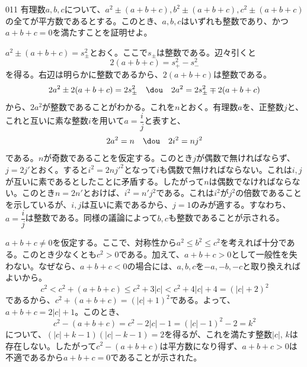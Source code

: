 \begin{prob}{011}{}{}
 有理数$a,b,c$について、$a^2\pm (a+b+c), b^2\pm (a+b+c), c^2\pm (a+b+c)$の全てが平方数であるとする。このとき、$a,b,c$はいずれも整数であり、かつ$a+b+c=0$を満たすことを証明せよ。
\end{prob}

$a^2\pm (a+b+c)=s_\pm^2$とおく。ここで$s_\pm$は整数である。辺々引くと
\[ 2(a+b+c)=s_+^2-s_-^2 \]
を得る。右辺は明らかに整数であるから、$2(a+b+c)$は整数である。
\[ 2a^2\pm 2(a+b+c)=2s_\pm^2 \quad\dou\quad 2a^2=2s_\pm^2\mp 2(a+b+c) \]
から、$2a^2$が整数であることがわかる。これを$n$とおく。有理数$a$を、正整数$j$と、これと互いに素な整数$i$を用いて$a=\dfrac{i}{j}$と表すと、
\[ 2a^2=n \quad\dou\quad 2i^2=nj^2 \]
である。$n$が奇数であることを仮定する。このとき$j$が偶数で無ければならず、$j=2j'$とおく。すると$i^2=2nj'^2$となって$i$も偶数で無ければならない。これは$i, j$が互いに素であるとしたことに矛盾する。したがって$n$は偶数でなければならない。このとき$n=2n'$とおけば、$i^2=n'j^2$である。これは$i^2$が$j^2$の倍数であることを示しているが、$i, j$は互いに素であるから、$j=1$のみが適する。すなわち、$a=\dfrac{i}{j}$は整数である。同様の議論によって$b, c$も整数であることが示される。

$a+b+c\neq 0$を仮定する。ここで、対称性から$a^2\le b^2\le c^2$を考えれば十分である。このとき少なくとも$c^2>0$である。加えて、$a+b+c>0$として一般性を失わない。なぜなら、$a+b+c<0$の場合には、$a, b, c$を$-a, -b, -c$と取り換えればよいから。
\[ c^2 < c^2+(a+b+c) \le c^2+3|c| < c^2+4|c|+4=(|c|+2)^2 \]
であるから、$c^2+(a+b+c)=(|c|+1)^2$である。よって、$a+b+c=2|c|+1$。このとき、
\[ c^2-(a+b+c)=c^2-2|c|-1=(|c|-1)^2-2=k^2 \]
について、$(|c|+k-1)(|c|-k-1)=2$を得るが、これを満たす整数$|c|$, $k$は存在しない。したがって$c^2-(a+b+c)$は平方数になり得ず、$a+b+c>0$は不適であるから$a+b+c=0$であることが示された。
